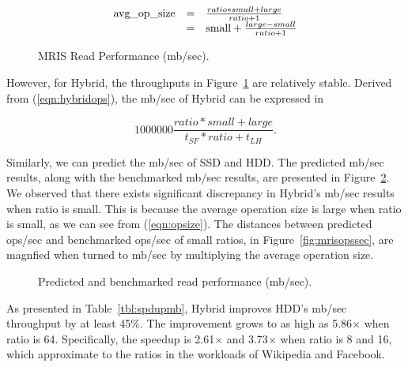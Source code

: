 \begin{equation}
\label{eqn:opsize}
\begin{array}{r@{\quad=\quad}l}
  \mbox{avg\_op\_size} & \frac{ratio * small + large}{ratio + 1} \\
   & \mbox{small} + \frac{large - small}{ratio + 1} 
\end{array}
\end{equation}

\begin{figure}[t]
\begin{centering}
\caption{MRIS Read Performance (mb/sec).}
\label{fig:mrismbsec}
\end{centering}
\end{figure}

However, for Hybrid, the throughputs in Figure~\ref{fig:mrismbsec} are
relatively stable. Derived from (\ref{eqn:hybridops}), the mb/sec of
Hybrid can be expressed in

\begin{equation}
\label{eqn:hybridthput}
    1000000 \frac{ratio * small + large}{t_{SF} * ratio + t_{LH}} .
\end{equation}

Similarly, we can predict the mb/sec of SSD and HDD. The predicted
mb/sec results, along with the benchmarked mb/sec results, are
presented in Figure~\ref{fig:thputpred}. We observed that there exists
significant discrepancy in Hybrid's mb/sec results when ratio is
small. This is because the average operation size is large when ratio
is small, as we can see from (\ref{eqn:opsize}). The distances between
predicted ops/sec and benchmarked ops/sec of small ratios, in
Figure~\ref{fig:mrisopssec}, are magnfied when turned to mb/sec by
multiplying the average operation size.

\begin{figure}[t]
\begin{centering}
\caption{Predicted and benchmarked read performance (mb/sec).}
\label{fig:thputpred}
\end{centering}
\end{figure}

As presented in Table~\ref{tbl:spdupmb}, Hybrid improves HDD's mb/sec
throughput by at least 45\%. The improvement grows to as high as
5.86$\times$ when ratio is 64.  Specifically, the speedup is
2.61$\times$ and 3.73$\times$ when ratio is 8 and 16, which
approximate to the ratios in the workloads of Wikipedia and Facebook.

